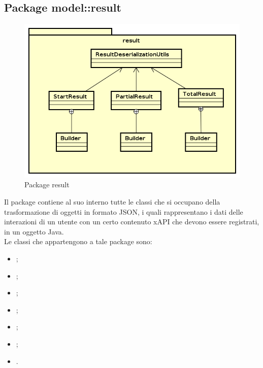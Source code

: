 \documentclass[../Tesi.tex]{subfiles}
\begin{document}
	\subsection{Package model::result}
		\begin{figure}[H]
			\centering
			\includegraphics[scale=0.6]{images/package_diagrams/result}
				\caption{Package result}
		\end{figure}
		Il package  contiene al suo interno tutte le classi che si occupano della trasformazione di oggetti in formato JSON, i quali rappresentano i dati delle interazioni di un utente con un certo contenuto xAPI che devono essere registrati, in un oggetto Java. \\
		Le classi che appartengono a tale package sono:
		\begin{itemize}
			\item {};
			\item {};
			\item {};
			\item {};
			\item {};
			\item {};
			\item {}.
		\end{itemize}
\end{document}
